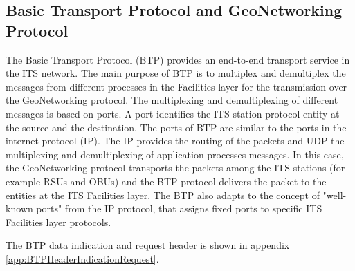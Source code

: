 \subsection{Basic Transport Protocol and GeoNetworking Protocol}\label{sec:BTP}

The Basic Transport Protocol (BTP) provides an end-to-end transport service in the ITS network. The main purpose of BTP is to multiplex and demultiplex the messages from different processes in the Facilities layer for the transmission over the GeoNetworking protocol.
The multiplexing and demultiplexing of different messages is based on ports. A port identifies the ITS station protocol entity at the source and the destination. The ports of BTP are similar to the ports in the internet protocol (IP). The IP provides the routing of the packets and UDP the multiplexing and demultiplexing of application processes messages. In this case, the GeoNetworking protocol transports the packets among the ITS stations (for example RSUs and OBUs) and the BTP protocol delivers the packet to the entities at the ITS Facilities layer. The BTP also adapts to the concept of "well-known ports" from the IP protocol, that assigns fixed ports to specific ITS Facilities layer protocols.  \cite{ETSI_TS_102_636-5-1}

The BTP data indication and request header is shown in appendix \ref{app:BTPHeaderIndicationRequest}.

\clearpage
\pagebreak